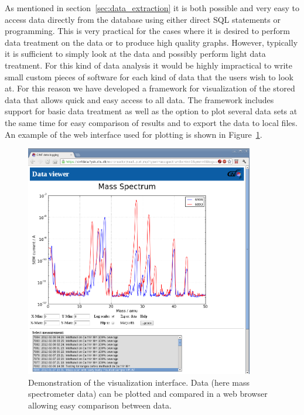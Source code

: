 As mentioned in section~\ref{sec:data_extraction} it is both possible and very
easy to access data directly from the database using either direct SQL
statements or programming. This is very practical for the cases where it is
desired to perform data treatment on the data or to produce high quality
graphs. However, typically it is sufficient to simply look at the data
and possibly perform light data treatment. For this kind of data analysis it
would be highly impractical to write small custom pieces of software for each
kind of data that the users wish to look at. For this reason we have developed
a framework for visualization of the stored data that allows quick and easy
access to all data. The framework includes support for basic data treatment as
well as the option to plot several data sets at the same time for easy
comparison of results and to export the data to local files. An example of the
web interface used for plotting is shown in Figure~\ref{fig:webinterface}.
\begin{figure}
 \begin{center}
 \includegraphics[width=10cm]{mass_spectra_comparison.png}
 \caption{Demonstration of the visualization interface. Data (here mass
   spectrometer data) can be plotted and compared in a web browser allowing
   easy comparison between data. \label{fig:webinterface}
 } 
 \end{center}
\end{figure}

